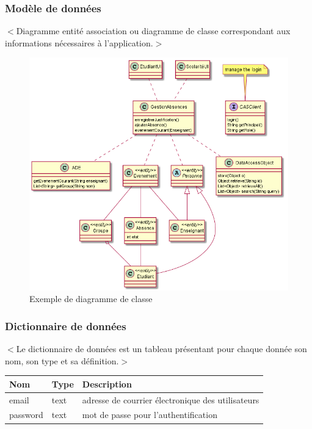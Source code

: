 \documentclass{scrreprt}
\begin{document}
\subsubsection{Modèle de données}
$<$Diagramme entité association ou diagramme de classe correspondant aux informations nécessaires à l'application.$>$

\begin{figure}
\includegraphics[width=\textwidth]{"AbsencesClasses"}
\caption{Exemple de diagramme de classe}
\end{figure}
\subsubsection{Dictionnaire de données}
$<$Le dictionnaire de données est un tableau présentant pour chaque donnée son nom, son type et sa définition.$>$

\begin{center}
\begin{tabular}{ |l|l|l| } 
 \hline
 Nom & Type  & Description \\ 
 \hline\hline
 email & text & adresse de courrier électronique des utilisateurs \\ 
 \hline
 password & text & mot de passe pour l'authentification \\ 
 \hline
\end{tabular}
\end{center}



\end{document}
